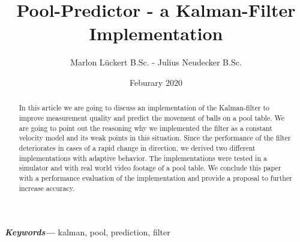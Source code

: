 \documentclass[notitlepage, a4paper, 11pt]{scrartcl}
\providecommand{\keywords}[1]
{
  \small	
  \textbf{\textit{Keywords---}} #1
}
\begin{document}
\title{Pool-Predictor - a Kalman-Filter Implementation}
\author{Marlon Lückert B.Sc. - Julius Neudecker B.Sc.}
\date{Feburary 2020}

\maketitle

\begin{abstract}
In this article we are going to discuss an implementation of the Kalman-filter \cite{kalman} to improve measurement quality and predict the movement of balls on a pool table. 
We are going to point out the reasoning why we implemented the filter as a constant velocity model and its weak points in this situation.
Since the performance of the filter deteriorates in cases of a rapid change in direction, we derived two different implementations with adaptive behavior.
The implementations were tested in a simulator and with real world video footage of a pool table.
We conclude this paper with a performance evaluation of the implementation and provide a proposal to further increase accuracy.

\end{abstract}

\keywords{kalman, pool, prediction, filter}
\end{document}
